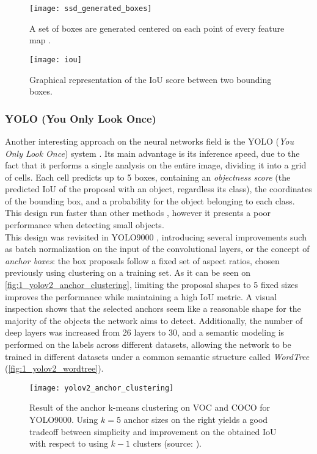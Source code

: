 \begin{figure}[h]
	\centering
	\texttt{[image: ssd\_generated\_boxes]}
	\caption{A set of boxes are generated centered on each point of every feature map \cite{ssd}.}
	\label{fig:1_ssd_generated_boxes}
\end{figure}

\begin{figure}[h]
	\centering
	\texttt{[image: iou]}
	\caption{Graphical representation of the IoU score between two bounding boxes.}
	\label{fig:1_iou}
\end{figure}

\subsubsection{YOLO (You Only Look Once)}

Another interesting approach on the neural networks field is the YOLO (\textit{You Only Look Once}) system \cite{yolov1}. Its main advantage is its inference speed, due to the fact that it performs a single analysis on the entire image, dividing it into a grid of cells. Each cell predicts up to 5 boxes, containing an \textit{objectness score} (the predicted IoU of the proposal with an object, regardless its class), the coordinates of the bounding box, and a probability for the object belonging to each class. This design run faster than other methods \cite{yolov1}, however it presents a poor performance when detecting small objects.\\

This design was revisited in YOLO9000 \cite{yolov2}, introducing several improvements such as batch normalization on the input of the convolutional layers, or the concept of \textit{anchor boxes}: the box proposals follow a fixed set of aspect ratios, chosen previously using clustering on a training set. As it can be seen on \autoref{fig:1_yolov2_anchor_clustering}, limiting the proposal shapes to 5 fixed sizes improves the performance while maintaining a high IoU metric. A visual inspection shows that the selected anchors seem like a reasonable shape for the majority of the objects the network aims to detect. Additionally, the number of deep layers was increased from 26 layers to 30, and a semantic modeling is performed on the labels across different datasets, allowing the network to be trained in different datasets under a common semantic structure called \textit{WordTree} (\autoref{fig:1_yolov2_wordtree}).

\begin{figure}[h]
	\centering
	\texttt{[image: yolov2\_anchor\_clustering]}
	\caption{Result of the anchor k-means clustering on VOC and COCO for YOLO9000. Using $k=5$ anchor sizes on the right yields a good tradeoff between simplicity and improvement on the obtained IoU with respect to using $k-1$ clusters (source: \cite{yolov2}).}
	\label{fig:1_yolov2_anchor_clustering}
\end{figure}

